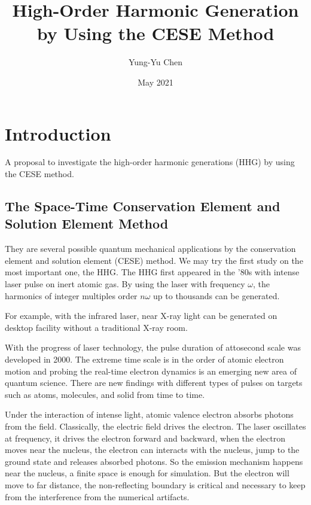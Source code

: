 \documentclass{isildur}
\title{
%
High-Order Harmonic Generation by Using the CESE Method
%
}
\author{
%
Yung-Yu Chen
%
}
\date{May 2021}
\begin{document}
\maketitle

\tableofcontents

\chapter{Introduction}
\label{c:intro}

A proposal to investigate the high-order harmonic generations (HHG) by using
the CESE method.

\section{The Space-Time Conservation Element and Solution Element Method}

They are several possible quantum mechanical applications by the conservation
element and solution element (CESE) method.  We may try the first study on the
most important one, the HHG.  The HHG first appeared in the ’80s with intense
laser pulse on inert atomic gas.  By using the laser with frequency $\omega$,
the harmonics of integer multiples order $n\omega$ up to thousands can be
generated.

For example, with the infrared laser, near X-ray light can be generated on
desktop facility without a traditional X-ray room.

With the progress of laser technology, the pulse duration of attosecond scale
was developed in 2000.  The extreme time scale is in the order of atomic
electron motion and probing the real-time electron dynamics is an emerging new
area of quantum science.  There are new findings with different types of pulses
on targets such as atoms, molecules, and solid from time to time.

Under the interaction of intense light, atomic valence electron absorbs photons
from the field.  Classically, the electric field drives the electron.  The
laser oscillates at frequency, it drives the electron forward and backward,
when the electron moves near the nucleus, the electron can interacts with the
nucleus, jump to the ground state and releases absorbed photons.  So the
emission mechanism happens near the nucleus, a finite space is enough for
simulation.  But the electron will move to far distance, the non-reflecting
boundary is critical and necessary to keep from the interference from the
numerical artifacts.
\end{document}
